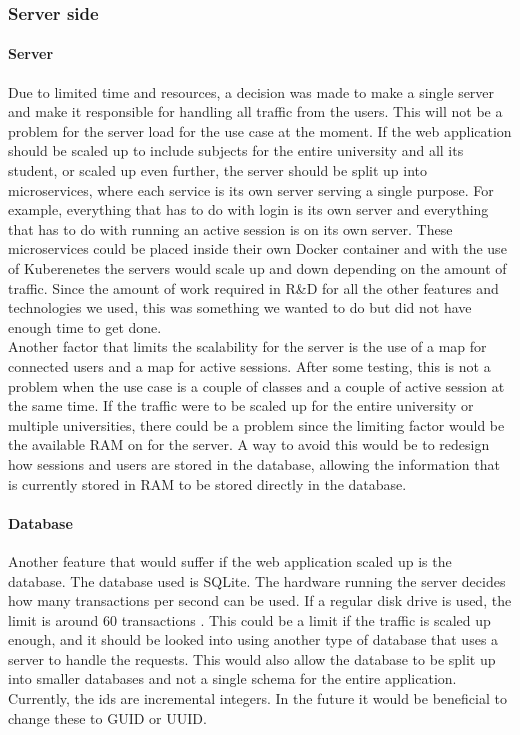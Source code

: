 \subsubsection{Server side}
\paragraph{Server}
Due to limited time and resources, a decision was made to make a single server and make it responsible for handling all traffic from the users. This will not be a problem for the server load for the use case at the moment. If the web application should be scaled up to include subjects for the entire university and all its student, or scaled up even further, the server should be split up into microservices, where each service is its own server serving a single purpose. For example, everything that has to do with login is its own server and everything that has to do with running an active session is on its own server. These microservices could be placed inside their own Docker\cite{Docker:INFO} container and with the use of Kuberenetes\cite{Kubernetes:INFO} the servers would scale up and down depending on the amount of traffic. Since the amount of work required in R\&D for all the other features and technologies we used, this was something we wanted to do but did not have enough time to get done.
\\[11pt]
Another factor that limits the scalability for the server is the use of a map for connected users and a map for active sessions. After some testing, this is not a problem when the use case is a couple of classes and a couple of active session at the same time. If the traffic were to be scaled up for the entire university or multiple universities, there could be a problem since the limiting factor would be the available RAM on for the server. A way to avoid this would be to redesign how sessions and users are stored in the database, allowing the information that is currently stored in RAM to be stored directly in the database. 
\paragraph{Database}
Another feature that would suffer if the web application scaled up is the database. The database used is SQLite. The hardware running the server decides how many transactions per second can be used. If a regular disk drive is used, the limit is around 60 transactions \cite{SQLite:faqQ19}. This could be a limit if the traffic is scaled up enough, and it should be looked into using another type of database that uses a server to handle the requests. This would also allow the database to be split up into smaller databases and not a single schema for the entire application. Currently, the ids are incremental integers. In the future it would be beneficial to change these to GUID or UUID.\cite{UUIDE}